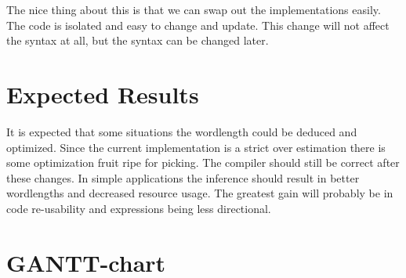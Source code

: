 \documentclass[msc,lith,english]{liuthesis}
\begin{document}
The nice thing about this is that we can swap out the implementations easily. The code is isolated and easy to change and update. This change will not affect the syntax at all, but the syntax can be changed later.

\section{Expected Results}
It is expected that some situations the wordlength could be deduced and optimized. Since the current implementation is a strict over estimation there is some optimization fruit ripe for picking. The compiler should still be correct after these changes. In simple applications the inference should result in better wordlengths and decreased resource usage. The greatest gain will probably be in code re-usability and expressions being less directional.

\newpage
\section{GANTT-chart}
\end{document}
